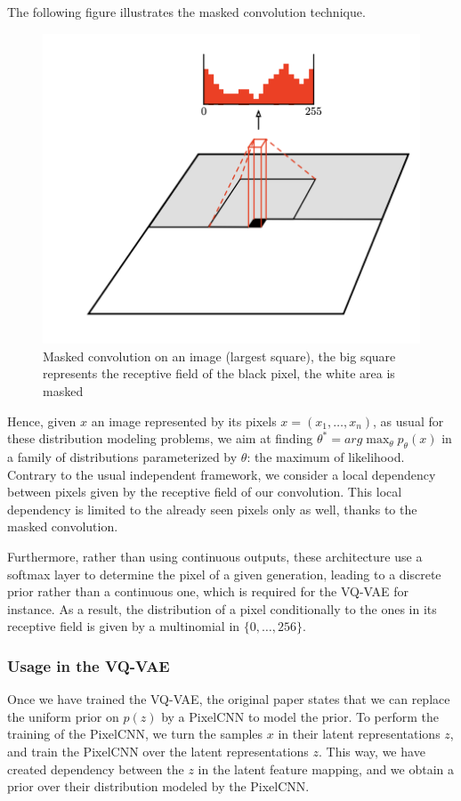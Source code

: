 The following figure illustrates the masked convolution technique.
\begin{figure}[H]
    \center
    \includegraphics[scale=0.9]{images/masked_convolution_pixel_cnn}
    \caption{Masked convolution on an image (largest square), the big square represents the receptive field of the black pixel, the white area is masked}
    \label{fig:masked_convolution_pixel_cnn}
\end{figure}

Hence, given $x$ an image represented by its pixels $x = (x_1, \dots, x_n)$, as usual for these distribution modeling problems, we aim at finding $\theta^* = arg\max_{\theta} p_{\theta}(x)$ in a family of distributions parameterized by $\theta$: the maximum of likelihood.
Contrary to the usual independent framework, we consider a local dependency between pixels given by the receptive field of our convolution.
This local dependency is limited to the already seen pixels only as well, thanks to the masked convolution.
\medskip

Furthermore, rather than using continuous outputs, these architecture use a softmax layer to determine the pixel of a given generation,
leading to a discrete prior rather than a continuous one, which is required for the VQ-VAE for instance.
As a result, the distribution of a pixel conditionally to the ones in its receptive field is given by a multinomial in $\{0, \dots, 256\}$.
\medskip

\subsubsection{Usage in the VQ-VAE}

Once we have trained the VQ-VAE, the original paper states that we can replace the uniform prior on $p(z)$ by a PixelCNN to model the prior.
To perform the training of the PixelCNN, we turn the samples $x$ in their latent representations $z$, and train the PixelCNN over the latent representations $z$.
This way, we have created dependency between the $z$ in the latent feature mapping, and we obtain a prior over their distribution modeled by the PixelCNN.

